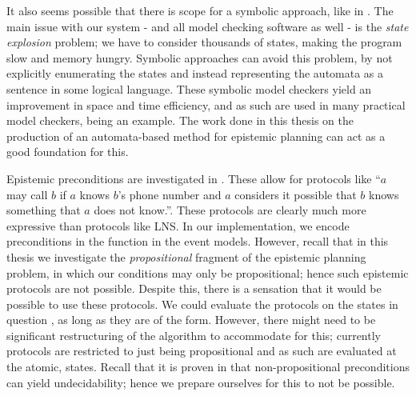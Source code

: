 \documentclass[ %
                    author={Leo Poulson},
                supervisor={Dr. Steven Ramsay},
                    degree={BSc},
                     title={Epistemic Planning for the Dynamic Gossip problem},
                  subtitle={},
                      year={2019} ]{dissertation}
\begin{document}
It also seems possible that there is scope for a symbolic approach, like in
\cite{MalvinThesis}. The main issue with our system - and all model checking
software as well - is the \emph{state explosion} problem; we have to consider
thousands of states, making the program slow and memory hungry. Symbolic
approaches can avoid this problem, by not explicitly enumerating the states and
instead representing the automata as a sentence in some logical language. These
symbolic model checkers yield an improvement in space and time efficiency, and
as such are used in many practical model checkers, \cite{SMCDEL} being an
example. The work done in this thesis on the production of an automata-based
method for epistemic planning can act as a good foundation for this.


Epistemic preconditions are investigated in \cite{EpProforDyGo}. These allow for
protocols like ``$a$ may call $b$ if $a$ knows $b$'s phone number and $a$
considers it possible that $b$ knows something that $a$ does not know.''. These
protocols are clearly much more expressive than protocols like \textsf{LNS}. In
our implementation, we encode preconditions in the \tpre function in the event
models. However, recall that in this thesis we investigate the
\emph{propositional} fragment of the epistemic planning problem, in which our
\tpre conditions may only be propositional; hence such epistemic protocols are
not possible. Despite this, there is a sensation that it would be possible to
use these protocols. We could evaluate the protocols on the states in question ,
as long as they are of the  form. However, there might need to be
significant restructuring of the algorithm to accommodate for this; currently
protocols are restricted to just being propositional and as such are evaluated
at the atomic,  states. Recall that it is proven in
\cite{UndecidabilityEP} that non-propositional preconditions can yield
undecidability; hence we prepare ourselves for this to not be possible.


\backmatter 

\newpage

\printbibliography[title={Bibliography}]
\end{document}
